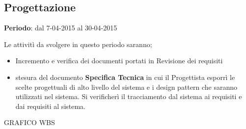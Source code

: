 \subsection{Progettazione}
\textbf{Periodo}: dal 7-04-2015 al 30-04-2015

Le attivit\`{i} da svolgere in questo periodo saranno;

\begin{itemize}
\item Incremento e verifica dei documenti portati in Revisione dei requisiti 
\item stesura del documento \textbf{Specifica Tecnica} in cui il Progettista esporr\`{i} le scelte progettuali di alto livello del sistema e i design pattern che saranno utilizzati nel sistema. Si verificher\`{i} il tracciamento dal sistema ai requisiti e dai requisiti al sistema.
\end{itemize}


GRAFICO WBS


